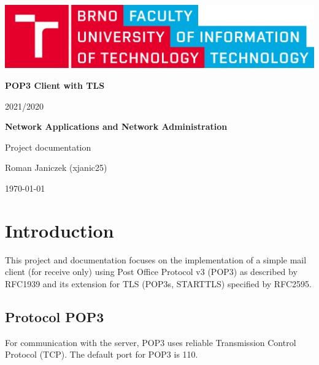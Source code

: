 \documentclass{article}
\begin{document}
\begin{titlepage}
\centering
\includegraphics[scale=0.1,keepaspectratio]{img/logo_en.png}
\vspace{5cm}

{\textbf{\Huge POP3 Client with TLS}}

\vspace{0.25cm}
{\LARGE 2021/2020}
\vspace{1cm}

{\textbf{\LARGE Network Applications and Network Administration}}
\vspace{0.25cm}


{\LARGE Project documentation}
\vspace{1cm}

{\Large Roman Janiczek (xjanic25)}

\vspace{1cm}
{\large \today}

\end{titlepage}

\newpage

\tableofcontents

\newpage

\section{Introduction}
\par
This project and documentation focuses on the implementation of a simple mail client (for receive only) using Post Office Protocol v3 (POP3) as described by RFC1939 and its extension for TLS (POP3s, STARTTLS) specified by RFC2595.
\newpage


\subsection{Protocol POP3}
\par
For communication with the server, POP3 uses reliable Transmission Control Protocol (TCP). The default port for POP3 is 110. 
\end{document}
